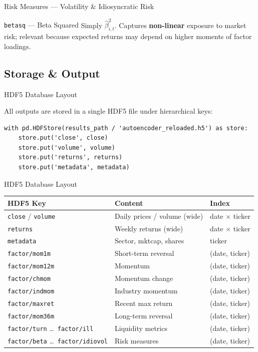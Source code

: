 \documentclass[aspectratio=169]{beamer}
\begin{document}
%
%
\begin{frame}[fragile]{Risk Measures --- Volatility \& Idiosyncratic Risk}

\begin{block}{\texttt{betasq} --- Beta Squared}
Simply $\hat\beta_{i,t}^2$. Captures \textbf{non-linear} exposure to market risk;
relevant because expected returns may depend on higher moments of factor loadings.
\end{block}

\end{frame}
%
\subsection{Storage \& Output}
%
\begin{frame}[fragile]{HDF5 Database Layout}

All outputs are stored in a single HDF5 file under hierarchical keys:

\begin{lstlisting}
with pd.HDFStore(results_path / 'autoencoder_reloaded.h5') as store:
    store.put('close', close)
    store.put('volume', volume)
    store.put('returns', returns)
    store.put('metadata', metadata)
\end{lstlisting}
\end{frame}
%
%
\begin{frame}[fragile]{HDF5 Database Layout}

\centering
\small
\begin{tabular}{lll}
\toprule
\textbf{HDF5 Key} & \textbf{Content} & \textbf{Index} \\
\midrule
\texttt{close} / \texttt{volume} & Daily prices / volume (wide) & date $\times$ ticker \\
\texttt{returns} & Weekly returns (wide) & date $\times$ ticker \\
\texttt{metadata} & Sector, mktcap, shares & ticker \\
\midrule
\texttt{factor/mom1m} & Short-term reversal & (date, ticker) \\
\texttt{factor/mom12m} & Momentum & (date, ticker) \\
\texttt{factor/chmom} & Momentum change & (date, ticker) \\
\texttt{factor/indmom} & Industry momentum & (date, ticker) \\
\texttt{factor/maxret} & Recent max return & (date, ticker) \\
\texttt{factor/mom36m} & Long-term reversal & (date, ticker) \\
\texttt{factor/turn} \ldots\ \texttt{factor/ill} & Liquidity metrics & (date, ticker) \\
\texttt{factor/beta} \ldots\ \texttt{factor/idiovol} & Risk measures & (date, ticker) \\
\bottomrule
\end{tabular}

\end{frame}
\end{document}
